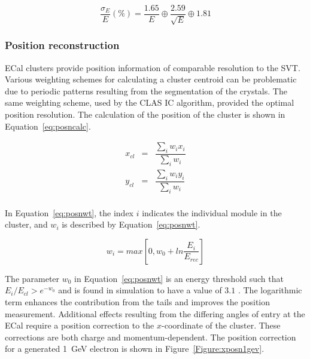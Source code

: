 \begin{equation}
\label{eq:eResUpdated}
\dfrac{\sigma_E}{E} (\%) = \dfrac{1.65}{E} \oplus \dfrac{2.59}{\sqrt{E}} \oplus 1.81 
\end{equation}

\subsubsection{Position reconstruction}
\indent ECal clusters provide position information of comparable resolution to the SVT. Various weighting schemes for calculating a cluster centroid can be problematic due to periodic patterns resulting from the segmentation of the crystals. The same weighting scheme, used by the CLAS IC algorithm, provided the optimal position resolution. The calculation of the position of the cluster is shown in Equation~\eqref{eq:posncalc}.~\cite{Garcon}

\begin{eqnarray*}
\label{eq:posncalc}
x_{cl} & = & \dfrac{\sum_i w_i x_i}{\sum_i w_i}\\
y_{cl} & = & \dfrac{\sum_i w_i y_i}{\sum_i w_i}\\
\end{eqnarray*}

In Equation~\eqref{eq:posnwt}, the index $i$ indicates the individual module in the cluster, and $w_i$ is described by Equation~\eqref{eq:posnwt}.

\begin{equation}
\label{eq:posnwt}
w_i  =  max[0, w_0+ ln\dfrac{E_i}{E_{rec}}]
\end{equation}

The parameter $w_0$ in Equation~\eqref{eq:posnwt} is an energy threshold such that $E_i/E_{cl} > e^{-w_0}$ and is found in simulation to have a value of $3.1$ \cite{Garcon}. The logarithmic term enhances the contribution from the tails and improves the position measurement. Additional effects resulting from the differing angles of entry at the ECal require a position correction to the $x$-coordinate of the cluster. These corrections are both charge and momentum-dependent. The position correction for a generated 1~GeV electron is shown in Figure~\ref{Figure:xposn1gev}.

